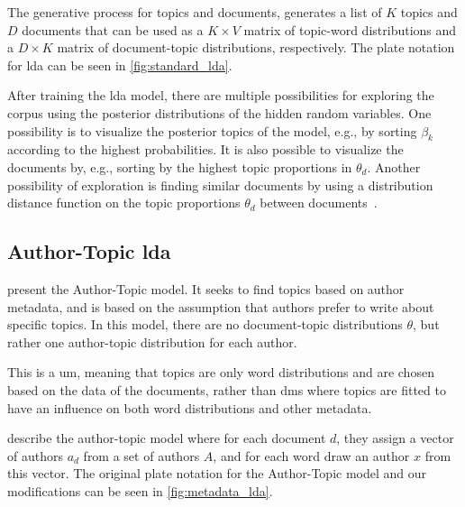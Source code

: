 The generative process for topics and documents, generates a list of $K$ topics and $D$ documents that can be used as a $K \times V$ matrix of topic-word distributions and a $D \times K$ matrix of document-topic distributions, respectively.
The plate notation for \gls{lda} can be seen in \autoref{fig:standard_lda}.



After training the \gls{lda} model, there are multiple possibilities for exploring the corpus using the posterior distributions of the hidden random variables.
One possibility is to visualize the posterior topics of the model, e.g., by sorting $\beta_k$ according to the highest probabilities.
It is also possible to visualize the documents by, e.g., sorting by the highest topic proportions in $\theta_d$.
Another possibility of exploration is finding similar documents by using a distribution distance function on the topic proportions $\theta_d$ between documents~\cite{blei2009topic}.


\subsection{Author-Topic \gls{lda}}\label{subsec:auth_prelim}
\citet{author_topic_2012} present the Author-Topic model.
It seeks to find topics based on author metadata, and is based on the assumption that authors prefer to write about specific topics.
In this model, there are no document-topic distributions $\theta$, but rather one author-topic distribution for each author.

This is a \gls{um}, meaning that topics are only word distributions and are chosen based on the data of the documents, rather than \glspl{dm} where topics are fitted to have an influence on both word distributions and other metadata.

\citet{author_topic_2012} describe the author-topic model where for each document $d$, they assign a vector of authors $a_d$ from a set of authors $A$, and for each word draw an author $x$ from this vector.
The original plate notation for the Author-Topic model and our modifications can be seen in \ref{fig:metadata_lda}.

